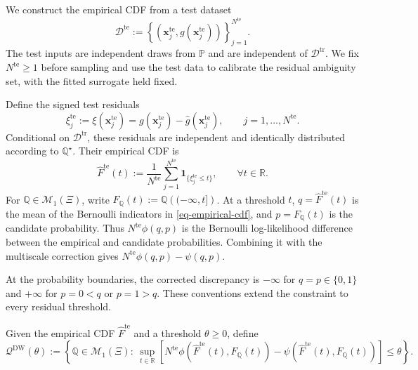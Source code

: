 \documentclass[review,11pt,3p,authoryear,nopreprintline]{elsarticle}
\begin{document}
We construct the empirical CDF from a test dataset
\[
  \mathcal D^{\mathrm{te}}:=\left\{\left(\bm x_j^{\mathrm{te}},g(\bm x_j^{\mathrm{te}})\right)\right\}_{j=1}^{N^{\mathrm{te}}}.
\]
The test inputs are independent draws from $\mathbb P$ and are independent of $\mathcal D^{\mathrm{tr}}$. We fix $N^{\mathrm{te}}\ge1$ before sampling and use the test data to calibrate the residual ambiguity set, with the fitted surrogate held fixed.

Define the signed test residuals
\[
  \xi_j^{\mathrm{te}}:=\xi(\bm x_j^{\mathrm{te}})=g(\bm x_j^{\mathrm{te}})-\hat g(\bm x_j^{\mathrm{te}}),\qquad j=1,\ldots,N^{\mathrm{te}}.
\]
Conditional on $\mathcal D^{\mathrm{tr}}$, these residuals are independent and identically distributed according to $\mathbb Q^\star$. Their empirical CDF is
\begin{equation}
  \widehat F^{\mathrm{te}}(t):=\frac{1}{N^{\mathrm{te}}}\sum_{j=1}^{N^{\mathrm{te}}}\mathbf 1_{\{\xi_j^{\mathrm{te}}\le t\}},\qquad \forall t\in\mathbb R.
  \label{eq-empirical-cdf}
\end{equation}
For $\mathbb Q\in\mathcal M_1(\Xi)$, write $F_{\mathbb Q}(t):=\mathbb Q\left(({-\infty},t]\right)$. At a threshold $t$, $q=\widehat F^{\mathrm{te}}(t)$ is the mean of the Bernoulli indicators in \eqref{eq-empirical-cdf}, and $p=F_{\mathbb Q}(t)$ is the candidate probability. Thus $N^{\mathrm{te}}\phi(q,p)$ is the Bernoulli log-likelihood difference between the empirical and candidate probabilities. Combining it with the multiscale correction gives $N^{\mathrm{te}}\phi(q,p)-\psi(q,p)$.

At the probability boundaries, the corrected discrepancy is $-\infty$ for $q=p\in\{0,1\}$ and $+\infty$ for $p=0<q$ or $p=1>q$. These conventions extend the constraint to every residual threshold.

\begin{definition}
  \label{definition-dw-ambiguity-set}
  Given the empirical CDF $\widehat F^{\mathrm{te}}$ and a threshold $\theta\ge0$, define
  \begin{equation} 
    \label{eq-cdf-ambiguity-set}
      \mathcal Q^{\mathrm{DW}}(\theta):=\left\{\mathbb Q\in\mathcal M_1(\Xi):\ 
      \sup_{t\in\mathbb R}\left[ N^{\mathrm{te}}\phi\!\left(\widehat F^{\mathrm{te}}(t),F_{\mathbb Q}(t)\right) 
       {}-\psi\!\left(\widehat F^{\mathrm{te}}(t),F_{\mathbb Q}(t)\right)\right]\le\theta\right\}. 
  \end{equation} 
\end{definition}
\end{document}
